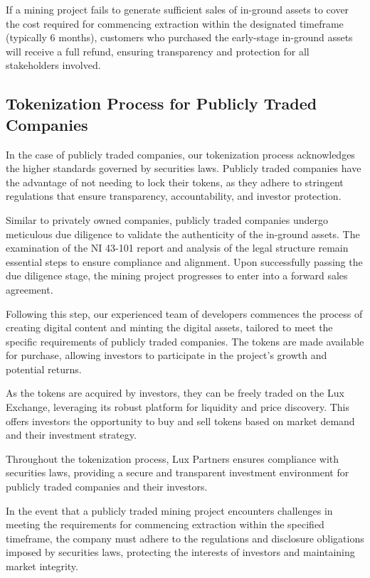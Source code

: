 \documentclass[11pt]{article}
\begin{document}
If a mining project fails to generate sufficient sales of in-ground assets to cover the cost required for commencing extraction within the designated timeframe (typically 6 months), customers who purchased the early-stage in-ground assets will receive a full refund, ensuring transparency and protection for all stakeholders involved.


\subsection{Tokenization Process for Publicly Traded Companies}

In the case of publicly traded companies, our tokenization process acknowledges the higher standards governed by securities laws. Publicly traded companies have the advantage of not needing to lock their tokens, as they adhere to stringent regulations that ensure transparency, accountability, and investor protection.


Similar to privately owned companies, publicly traded companies undergo meticulous due diligence to validate the authenticity of the in-ground assets. The examination of the NI 43-101 report and analysis of the legal structure remain essential steps to ensure compliance and alignment. Upon successfully passing the due diligence stage, the mining project progresses to enter into a forward sales agreement.


Following this step, our experienced team of developers commences the process of creating digital content and minting the digital assets, tailored to meet the specific requirements of publicly traded companies. The tokens are made available for purchase, allowing investors to participate in the project's growth and potential returns.


As the tokens are acquired by investors, they can be freely traded on the Lux Exchange, leveraging its robust platform for liquidity and price discovery. This offers investors the opportunity to buy and sell tokens based on market demand and their investment strategy.


Throughout the tokenization process, Lux Partners ensures compliance with securities laws, providing a secure and transparent investment environment for publicly traded companies and their investors.


In the event that a publicly traded mining project encounters challenges in meeting the requirements for commencing extraction within the specified timeframe, the company must adhere to the regulations and disclosure obligations imposed by securities laws, protecting the interests of investors and maintaining market integrity.
\end{document}
